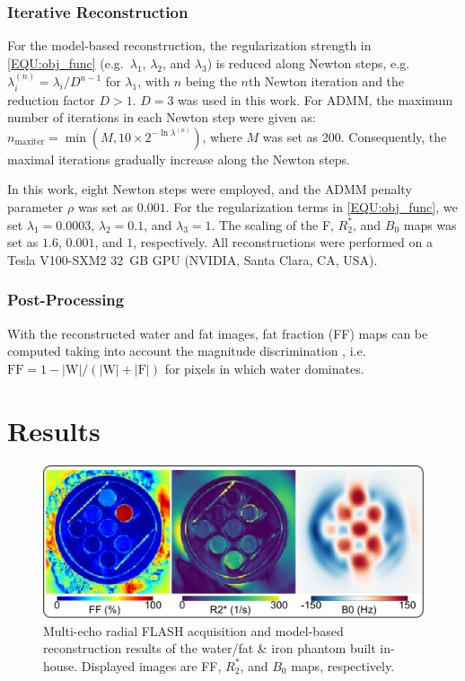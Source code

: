 \documentclass[journal,twoside,web]{ieeecolor}
\begin{document}
\subsubsection*{Iterative Reconstruction}

For the model-based reconstruction, the regularization strength in \cref{EQU:obj_func} 
(e.g.~$\lambda_1$, $\lambda_2$, and $\lambda_3$) 
is reduced along Newton steps, e.g.~$\lambda_i^{(n)} = \lambda_i / D^{n-1}$ for $\lambda_1$, 
with $n$ being the $n$th Newton iteration 
and the reduction factor $D > 1$. 
$D = 3$ was used in this work. 
For ADMM, the maximum number of iterations in each Newton step 
were given as:~$n_\text{maxiter} = \min (M, 10 \times 2^{- \ln \lambda^{(n)}})$, 
where $M$ was set as \num{200}. 
Consequently, the maximal iterations gradually increase along the Newton steps.

In this work, eight Newton steps were employed, 
and the ADMM penalty parameter $\rho$ was set as $0.001$. 
For the regularization terms in \cref{EQU:obj_func}, we set 
$\lambda_1 = 0.0003$, $\lambda_2 = 0.1$, and $\lambda_3 = 1$. 
The scaling of the F, $R_2^*$, and $B_0$ maps was set as 
$1.6$, $0.001$, and $1$, respectively.
All reconstructions were performed on a Tesla V100-SXM2 32~GB GPU 
(NVIDIA, Santa Clara, CA, USA).

\subsubsection*{Post-Processing}

With the reconstructed water and fat images, fat fraction (FF) maps can be computed 
taking into account the magnitude discrimination \cite{liu_2007_ff}, 
i.e.~$\text{FF} = 1 - |\text{W}| / (|\text{W}| + |\text{F}|)$ 
for pixels in which water dominates. 



\section{Results}

\begin{figure}
	\centering
	\includegraphics[width=\columnwidth]{../../figures/tan3.pdf}
	\caption{Multi-echo radial FLASH acquisition and 
		model-based reconstruction results 
		of the water/fat \& iron phantom built in-house. 
		Displayed images are FF, $R_2^*$, and $B_0$ maps, respectively.}
	\label{FIG:PHA}
\end{figure}
\end{document}
